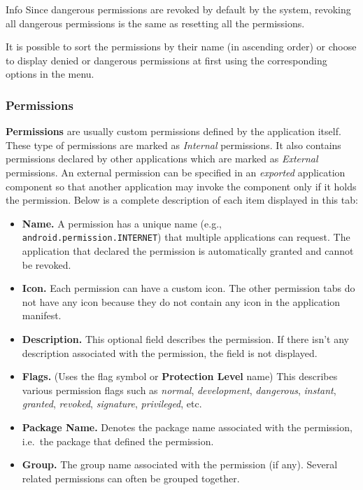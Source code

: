 \begin{tip}{Info}
    Since dangerous permissions are revoked by default by the system, revoking all dangerous permissions is the same as
    resetting all the permissions.
\end{tip}

It is possible to sort the permissions by their name (in ascending order) or choose to display denied or dangerous
permissions at first using the corresponding options in the menu.

\subsubsection{Permissions}\label{subsubsec:permissions} %
\textbf{Permissions} are usually custom permissions defined by the application itself. These type of
permissions are marked as \textit{Internal} permissions. It also contains permissions declared by
other applications which are marked as \textit{External} permissions. An external permission can be
specified in an \textit{exported} application component so that another application may invoke the
component only if it holds the permission. Below is a complete description of each item displayed in
this tab:
\begin{itemize}
    \item \textbf{Name.} A permission has a unique name (e.g., \texttt{android.permission.INTERNET})
    that multiple applications can request. The application that declared the permission is
    automatically granted and cannot be revoked.

    \item \textbf{Icon.} Each permission can have a custom icon. The other permission tabs do not have any icon because
    they do not contain any icon in the application manifest.

    \item \textbf{Description.} This optional field describes the permission. If there isn't any description associated
    with the permission, the field is not displayed.

    \item \textbf{Flags.} (Uses the flag symbol or \textbf{Protection Level} name) This describes various permission
    flags such as \textit{normal}, \textit{development}, \textit{dangerous}, \textit{instant}, \textit{granted},
    \textit{revoked}, \textit{signature}, \textit{privileged}, etc.

    \item \textbf{Package Name.} Denotes the package name associated with the permission, i.e.\ the package that defined
    the permission.

    \item \textbf{Group.} The group name associated with the permission (if any). Several related permissions can often
    be grouped together.
\end{itemize}

